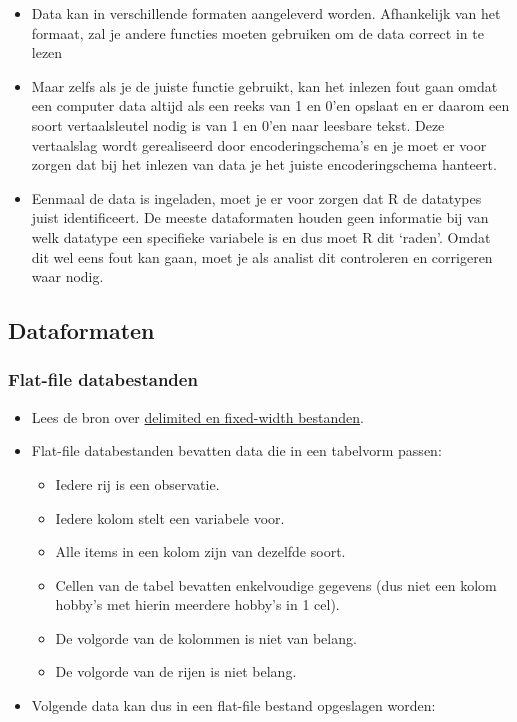 \documentclass[]{memoir}
\providecommand{\tightlist}{%
  \setlength{\itemsep}{0pt}\setlength{\parskip}{0pt}}
\begin{document}
\begin{itemize}
\tightlist
\item
  Data kan in verschillende formaten aangeleverd worden. Afhankelijk van het formaat, zal je andere functies moeten gebruiken om de data correct in te lezen
\item
  Maar zelfs als je de juiste functie gebruikt, kan het inlezen fout gaan omdat een computer data altijd als een reeks van 1 en 0'en opslaat en er daarom een soort vertaalsleutel nodig is van 1 en 0'en naar leesbare tekst. Deze vertaalslag wordt gerealiseerd door encoderingschema's en je moet er voor zorgen dat bij het inlezen van data je het juiste encoderingschema hanteert.
\item
  Eenmaal de data is ingeladen, moet je er voor zorgen dat R de datatypes juist identificeert. De meeste dataformaten houden geen informatie bij van welk datatype een specifieke variabele is en dus moet R dit `raden'. Omdat dit wel eens fout kan gaan, moet je als analist dit controleren en corrigeren waar nodig.
\end{itemize}

\hypertarget{dataformaten}{%
\subsection{Dataformaten}\label{dataformaten}}

\hypertarget{flat-file-databestanden}{%
\subsubsection{Flat-file databestanden}\label{flat-file-databestanden}}

\begin{itemize}
\tightlist
\item
  Lees de bron over \href{https://www.techwalla.com/articles/what-is-a-delimited-a-fixed-width-file}{delimited en fixed-width bestanden}.
\item
  Flat-file databestanden bevatten data die in een tabelvorm passen:

  \begin{itemize}
  \tightlist
  \item
    Iedere rij is een observatie.
  \item
    Iedere kolom stelt een variabele voor.
  \item
    Alle items in een kolom zijn van dezelfde soort.
  \item
    Cellen van de tabel bevatten enkelvoudige gegevens (dus niet een kolom hobby's met hierin meerdere hobby's in 1 cel).
  \item
    De volgorde van de kolommen is niet van belang.
  \item
    De volgorde van de rijen is niet belang.
  \end{itemize}
\item
  Volgende data kan dus in een flat-file bestand opgeslagen worden:
\end{itemize}
\end{document}

